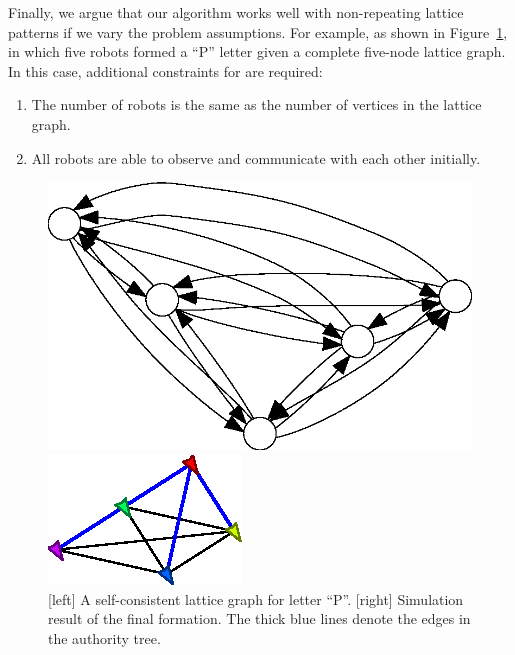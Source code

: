 Finally, we argue that our algorithm works well with non-repeating lattice patterns if we vary the problem assumptions.
%
For example, as shown in Figure~\ref{fig:p-letter}, in which five robots formed a ``P''
letter given a complete five-node lattice graph. 
%
In this case, additional constraints for are required: 
\begin{enumerate}
  \item The number of robots is the same as the number of vertices in the lattice graph.
  \item All robots are able to observe and communicate with each other initially.
\end{enumerate}
\begin{figure}
    \centering
  \begin{minipage}[b]{0.45\linewidth}
  \includegraphics[width=.9\columnwidth]{figs/pletter}
  \end{minipage}
   \begin{minipage}[b]{0.45\linewidth}
     \includegraphics[width=.9\columnwidth]{figs/p-formation}
   \end{minipage}
   \caption{[left] A self-consistent lattice graph for letter ``P''. [right]
     Simulation result of the final formation. 
     The thick blue lines denote the edges in the authority tree.}
   \label{fig:p-letter}
 \end{figure}
 

